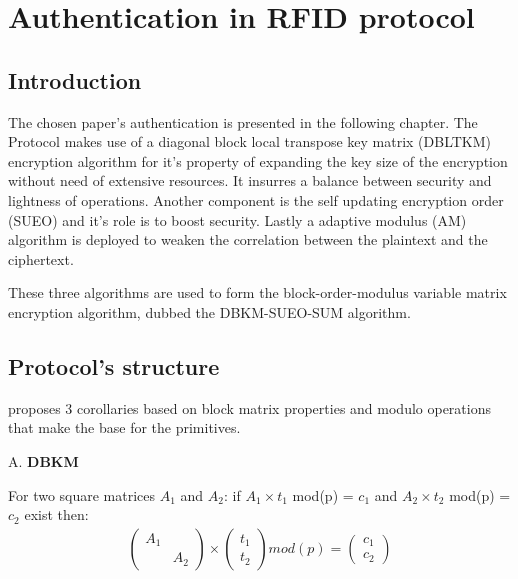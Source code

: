 \chapter{Authentication in RFID protocol}

\section{Introduction}
    The chosen paper\cite{BOM}'s authentication is presented in the following chapter. The Protocol makes use of a diagonal block local transpose key matrix (DBLTKM) 
    encryption algorithm for it's property of 
    expanding the key size of the encryption without need of extensive resources. It insurres a balance between security and lightness of operations. 
    Another component is the self updating encryption 
    order (SUEO) and it's role is to boost security. Lastly a adaptive modulus (AM) algorithm is deployed to weaken the correlation between the 
    plaintext and the ciphertext.
    
    These three algorithms are used to form the block-order-modulus variable matrix encryption algorithm, dubbed the DBKM-SUEO-SUM algorithm.

\section{Protocol's structure}

    \cite{BOM} proposes 3 corollaries based on block matrix properties and modulo operations that make the base for the primitives.

    A. \textbf{DBKM}

    For two square matrices $A_1$ and $A_2$: if $A_1 \times t_1$ mod(p) = $c_1$ and $A_2 \times t_2$ mod(p) = $c_2$ exist then:
    \begin{gather*}
        \begin{pmatrix}
        A_1 &  \\
            & A_2
        \end{pmatrix}
        \times
        \begin{pmatrix}
            t_1  \\
            t_2
        \end{pmatrix}
        mod(p)
        =
        \begin{pmatrix}
            c_1  \\
            c_2
        \end{pmatrix}
    \end{gather*}

